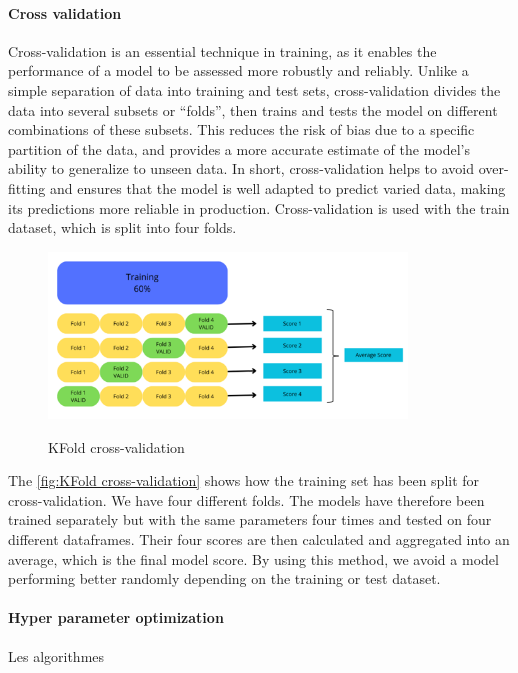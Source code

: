 \documentclass[12pt]{article}
\begin{document}
\paragraph{Cross validation}
Cross-validation is an essential technique in training, as it enables the performance of a model to be assessed more robustly and reliably. Unlike a simple separation of data into training and test sets, cross-validation divides the data into several subsets or “folds”, then trains and tests the model on different combinations of these subsets. This reduces the risk of bias due to a specific partition of the data, and provides a more accurate estimate of the model's ability to generalize to unseen data. In short, cross-validation helps to avoid over-fitting and ensures that the model is well adapted to predict varied data, making its predictions more reliable in production. Cross-validation is used with the train dataset, which is split into four folds.
\begin{figure}[h]
    \centering
    \includegraphics[width=0.85\textwidth]{KFold data.png}\\
    \caption{KFold cross-validation}
    \label{fig:KFold cross-validation}
\end{figure}
\FloatBarrier
The \autoref{fig:KFold cross-validation} shows how the training set has been split for cross-validation. We have four different folds. The models have therefore been trained separately but with the same parameters four times and tested on four different dataframes. Their four scores are then calculated and aggregated into an average, which is the final model score. By using this method, we avoid a model performing better randomly depending on the training or test dataset. 


\paragraph{Hyper parameter optimization}
Les algorithmes
\end{document}
